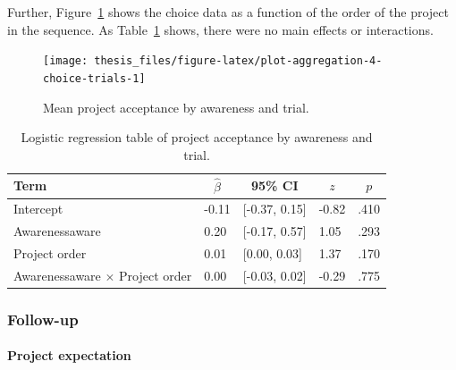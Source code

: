 \documentclass[a4paper, nobind, dvipsnames]{templates/ociamthesis}
\theoremstyle{definition}
\theoremstyle{definition}
\theoremstyle{definition}
\theoremstyle{definition}
\theoremstyle{remark}
\begin{document}
Further, Figure~\ref{fig:plot-aggregation-4-choice-trials} shows the choice
data as a function of the order of the project in the sequence. As
Table~\ref{tab:awareness-project-order} shows, there were no main effects or
interactions.



\begin{figure}
\texttt{[image: thesis\_files/figure-latex/plot-aggregation-4-choice-trials-1]} \caption{Mean project acceptance by awareness and trial.}\label{fig:plot-aggregation-4-choice-trials}
\end{figure}

\begin{table}[tbp]

\begin{center}
\begin{threeparttable}

\caption{\label{tab:awareness-project-order}Logistic regression table of project acceptance by awareness and trial.}

\begin{tabular}{lllll}
\toprule
Term & \multicolumn{1}{c}{$\hat{\beta}$} & \multicolumn{1}{c}{95\% CI} & \multicolumn{1}{c}{$z$} & \multicolumn{1}{c}{$p$}\\
\midrule
Intercept & -0.11 & {}[-0.37, 0.15] & -0.82 & .410\\
Awarenessaware & 0.20 & {}[-0.17, 0.57] & 1.05 & .293\\
Project order & 0.01 & {}[0.00, 0.03] & 1.37 & .170\\
Awarenessaware $\times$ Project order & 0.00 & {}[-0.03, 0.02] & -0.29 & .775\\
\bottomrule
\end{tabular}

\end{threeparttable}
\end{center}

\end{table}

\hypertarget{follow-up-4}{%
\subsubsection{Follow-up}\label{follow-up-4}}

\hypertarget{project-expectation-1}{%
\paragraph{Project expectation}\label{project-expectation-1}}
\end{document}
